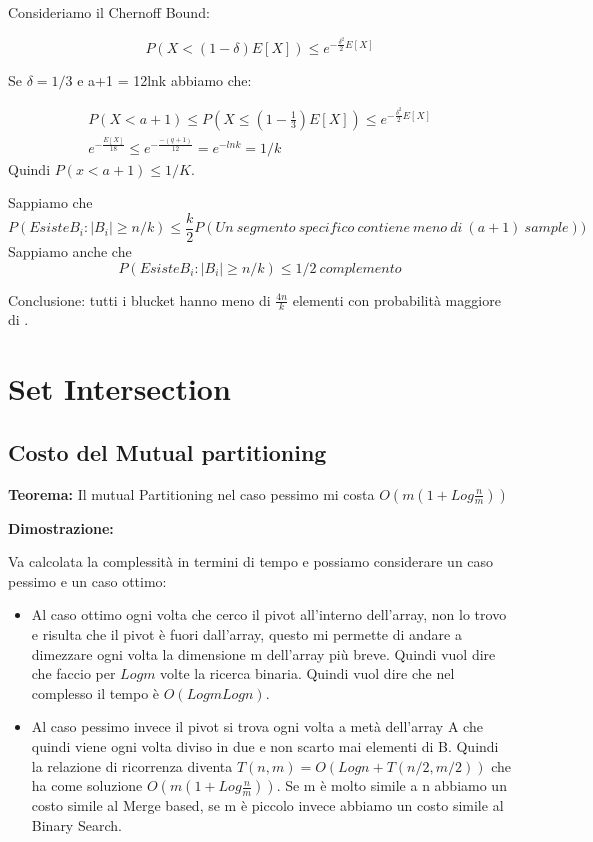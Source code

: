 \documentclass[12pt]{article}
\begin{document}
Consideriamo il Chernoff Bound:

\begin{equation}
    P(X<(1-\delta)E[X]) \leq e^{-\frac{\delta^2}{2}E[X]}
\end{equation}

Se $\delta = 1/3$ e a+1 = 12lnk abbiamo che:

\begin{equation*}
        \label{eq:pareto mle2}
            \begin{multlined}
            P(X < a+1) \leq P(X \leq (1- \frac{1}{3})E[X]) \leq e^{-\frac{\delta^2}{2}E[X]} \\
            e^{-\frac{E[X]}{18}} \leq e^{-\frac{-(q+1)}{12}} = e^{-lnk} = 1/k
            \end{multlined}
            \end{equation*}
Quindi $P(x < a+1) \leq 1/K$.

Sappiamo che 
\begin{equation}
    P(Esiste B_i : |B_i| \geq n/k) \leq \frac{k}{2} P(Un\ segmento\ specifico\ contiene\ meno\ di\ (a+1)\ sample))
\end{equation}
Sappiamo anche che 
\begin{equation}
    P(Esiste B_i : |B_i| \geq n/k) \leq 1/2\ complemento
\end{equation}

Conclusione: tutti i blucket hanno meno di $\frac{4n}{k}$ elementi con probabilità maggiore di .


\section{Set Intersection}

\subsection{Costo del Mutual partitioning}

\textbf{Teorema:} Il mutual Partitioning nel caso pessimo mi costa $O(m(1+Log\frac{n}{m}))$

\textbf{Dimostrazione:} 

Va calcolata la complessità in termini di tempo e possiamo considerare un caso pessimo e un caso ottimo:
\begin{itemize}
\item Al caso ottimo ogni volta che cerco il pivot all'interno dell'array, non lo trovo e risulta che il pivot è fuori dall'array, questo mi permette di andare a dimezzare ogni volta la dimensione m dell'array più breve. Quindi vuol dire che faccio per $Log m$ volte la ricerca binaria. Quindi vuol dire che nel complesso il tempo è $O(Log m Log n)$.
\item Al caso pessimo invece il pivot si trova ogni volta a metà dell'array A che quindi viene ogni volta diviso in due e non scarto mai elementi di B. Quindi la relazione di ricorrenza diventa $T(n,m) = O(Log n + T(n/2,m/2))$ che ha come soluzione $O(m(1+Log\frac{n}{m}))$.
Se m è molto simile a n abbiamo un costo simile al Merge based, se m è piccolo invece abbiamo un costo simile al Binary Search.
\end{itemize}
\end{document}
